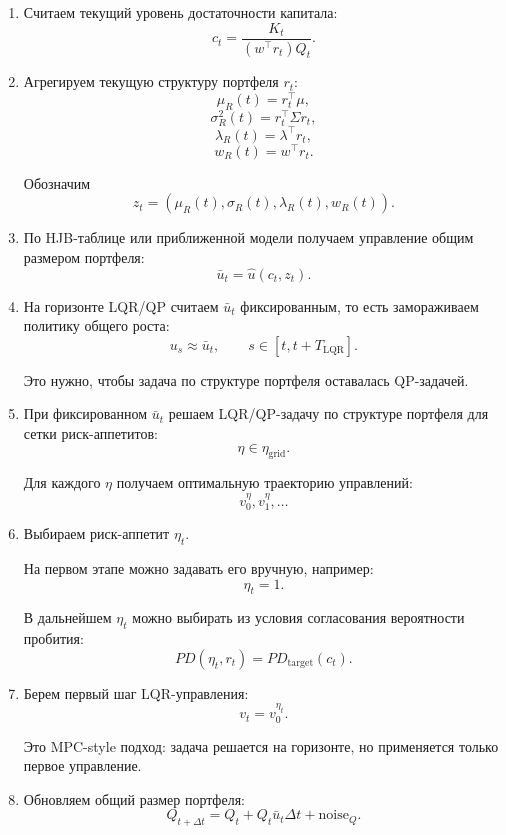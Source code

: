 \documentclass[12pt,a4paper]{article}
\begin{document}
\begin{enumerate}
    \item Считаем текущий уровень достаточности капитала:
    \[
        c_t =
        \frac{K_t}{(w^\top r_t)Q_t}.
    \]

    \item Агрегируем текущую структуру портфеля $r_t$:
    \[
        \mu_R(t) = r_t^\top \mu,
    \]
    \[
        \sigma_R^2(t) = r_t^\top \Sigma r_t,
    \]
    \[
        \lambda_R(t) = \lambda^\top r_t,
    \]
    \[
        w_R(t) = w^\top r_t.
    \]

    Обозначим
    \[
        z_t =
        (\mu_R(t),\sigma_R(t),\lambda_R(t),w_R(t)).
    \]

    \item По HJB-таблице или приближенной модели получаем управление общим размером портфеля:
    \[
        \bar u_t =
        \widehat u(c_t,z_t).
    \]

    \item На горизонте LQR/QP считаем $\bar u_t$ фиксированным, то есть замораживаем политику общего роста:
    \[
        u_s \approx \bar u_t,
        \qquad s \in [t,t+T_{\mathrm{LQR}}].
    \]

    Это нужно, чтобы задача по структуре портфеля оставалась QP-задачей.

    \item При фиксированном $\bar u_t$ решаем LQR/QP-задачу по структуре портфеля для сетки риск-аппетитов:
    \[
        \eta \in \eta_{\mathrm{grid}}.
    \]

    Для каждого $\eta$ получаем оптимальную траекторию управлений:
    \[
        v_0^\eta, v_1^\eta,\dots
    \]

    \item Выбираем риск-аппетит $\eta_t$.

    На первом этапе можно задавать его вручную, например:
    \[
        \eta_t = 1.
    \]

    В дальнейшем $\eta_t$ можно выбирать из условия согласования вероятности пробития:
    \[
        PD(\eta_t,r_t) = PD_{\mathrm{target}}(c_t).
    \]

    \item Берем первый шаг LQR-управления:
    \[
        v_t = v_0^{\eta_t}.
    \]

    Это MPC-style подход: задача решается на горизонте, но применяется только первое управление.

    \item Обновляем общий размер портфеля:
    \[
        Q_{t+\Delta t}
        =
        Q_t + Q_t\bar u_t\Delta t + \mathrm{noise}_Q.
    \]


\end{enumerate}
\end{document}
